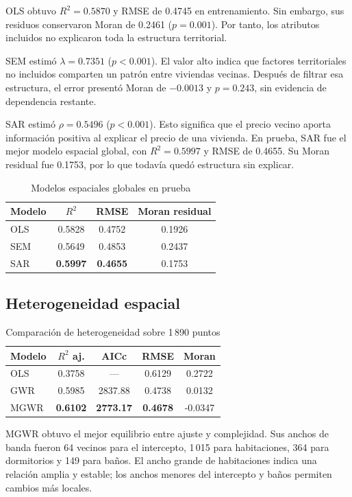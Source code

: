 \documentclass[conference]{IEEEtran}
\begin{document}
OLS obtuvo $R^2=0.5870$ y RMSE de 0.4745 en entrenamiento. Sin embargo, sus residuos conservaron Moran de 0.2461 ($p=0.001$). Por tanto, los atributos incluidos no explicaron toda la estructura territorial.

SEM estimó $\lambda=0.7351$ ($p<0.001$). El valor alto indica que factores territoriales no incluidos comparten un patrón entre viviendas vecinas. Después de filtrar esa estructura, el error presentó Moran de $-0.0013$ y $p=0.243$, sin evidencia de dependencia restante.

SAR estimó $\rho=0.5496$ ($p<0.001$). Esto significa que el precio vecino aporta información positiva al explicar el precio de una vivienda. En prueba, SAR fue el mejor modelo espacial global, con $R^2=0.5997$ y RMSE de 0.4655. Su Moran residual fue 0.1753, por lo que todavía quedó estructura sin explicar.

\begin{table}[!t]
\caption{Modelos espaciales globales en prueba}
\label{tab:global}
\centering
\begin{tabular}{lccc}
\toprule
Modelo & $R^2$ & RMSE & Moran residual\\
\midrule
OLS & 0.5828 & 0.4752 & 0.1926\\
SEM & 0.5649 & 0.4853 & 0.2437\\
SAR & \textbf{0.5997} & \textbf{0.4655} & 0.1753\\
\bottomrule
\end{tabular}
\end{table}

\subsection{Heterogeneidad espacial}

\begin{table}[!t]
\caption{Comparación de heterogeneidad sobre 1\,890 puntos}
\label{tab:heterogeneity}
\centering
\begin{tabular}{lcccc}
\toprule
Modelo & $R^2$ aj. & AICc & RMSE & Moran\\
\midrule
OLS & 0.3758 & --- & 0.6129 & 0.2722\\
GWR & 0.5985 & 2837.88 & 0.4738 & 0.0132\\
MGWR & \textbf{0.6102} & \textbf{2773.17} & \textbf{0.4678} & -0.0347\\
\bottomrule
\end{tabular}
\end{table}

MGWR obtuvo el mejor equilibrio entre ajuste y complejidad. Sus anchos de banda fueron 64 vecinos para el intercepto, 1\,015 para habitaciones, 364 para dormitorios y 149 para baños. El ancho grande de habitaciones indica una relación amplia y estable; los anchos menores del intercepto y baños permiten cambios más locales.
\end{document}
